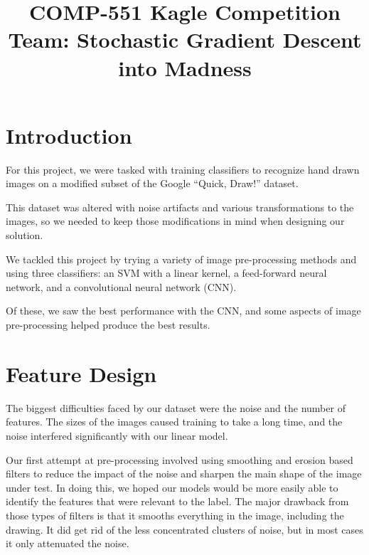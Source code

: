 \documentclass[conference]{IEEEtran}
\begin{document}
\title{COMP-551 Kagle Competition\\
{\Large Team: Stochastic Gradient Descent into Madness}
}

\author{
\and
{}
\and
{}
}

\maketitle

\section{\textbf{Introduction}}

For this project, we were tasked with training classifiers to recognize hand drawn images on a modified subset of the Google ``Quick, Draw!'' dataset.

This dataset was altered with noise artifacts and various transformations to the images, so we needed to keep those modifications in mind when designing our solution.

We tackled this project by trying a variety of image pre-processing methods and using three classifiers: an SVM with a linear kernel, a feed-forward neural network, and a convolutional neural network (CNN).

Of these, we saw the best performance with the CNN, and some aspects of image pre-processing helped produce the best results.

\section{\textbf{Feature Design}}

The biggest difficulties faced by our dataset were the noise and the number of features. The sizes of the images caused training to take a long time, and the noise interfered significantly with our linear model.

Our first attempt at pre-processing involved using smoothing and erosion based filters to reduce the impact of the noise and sharpen the main shape of the image under test. In doing this, we hoped our models would be more easily able to identify the features that were relevant to the label. The major drawback from those types of filters is that it smooths everything in the image, including the drawing. It did get rid of the less concentrated clusters of noise, but in most cases it only attenuated the noise.
\end{document}
